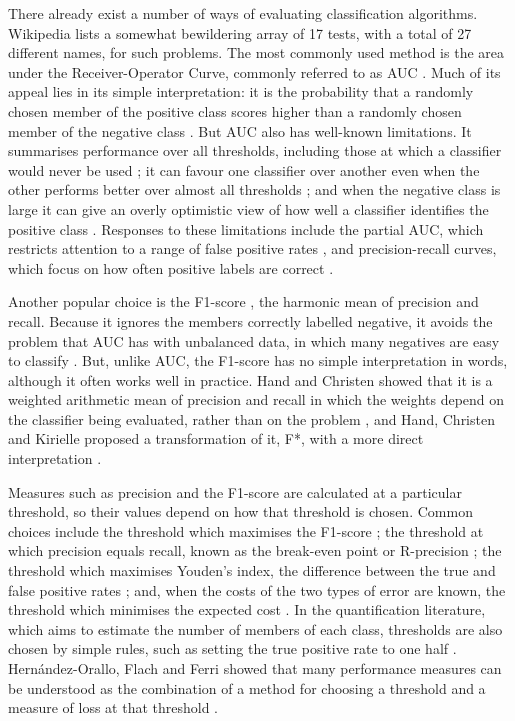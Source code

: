 \documentclass[preprint,12pt]{article}
\begin{document}
There already exist a number of ways of evaluating classification algorithms. Wikipedia lists a somewhat bewildering array of 17 tests, with a total of 27 different names, for such problems.  The most commonly used method is the area under the Receiver-Operator Curve, commonly referred to as AUC \cite{obuchowski2018receiver, vanderlooy2008critical, majnik2013roc}. Much of its appeal lies in its simple interpretation: it is the probability that a randomly chosen member of the positive class scores higher than a randomly chosen member of the negative class \cite{bamber1975area, hanley1982meaning}. But AUC also has well-known limitations. It summarises performance over all thresholds, including those at which a classifier would never be used \cite{lobo2008auc}; it can favour one classifier over another even when the other performs better over almost all thresholds \cite{hand2009measuring}; and when the negative class is large it can give an overly optimistic view of how well a classifier identifies the positive class \cite{davis2006relationship, saito2015precision}. Responses to these limitations include the partial AUC, which restricts attention to a range of false positive rates \cite{mcclish1989analyzing, dodd2003partial, carrington2020new}, and precision-recall curves, which focus on how often positive labels are correct \cite{davis2006relationship, saito2015precision, flach2015precision}.

Another popular choice is the F1-score \cite{sasaki2007truth}, the harmonic mean of precision and recall. Because it ignores the members correctly labelled negative, it avoids the problem that AUC has with unbalanced data, in which many negatives are easy to classify \cite{smlbook}. But, unlike AUC, the F1-score has no simple interpretation in words, although it often works well in practice. Hand and Christen showed that it is a weighted arithmetic mean of precision and recall in which the weights depend on the classifier being evaluated, rather than on the problem \cite{hand2018note}, and Hand, Christen and Kirielle proposed a transformation of it, F*, with a more direct interpretation \cite{hand2021f}.

Measures such as precision and the F1-score are calculated at a particular threshold, so their values depend on how that threshold is chosen. Common choices include the threshold which maximises the F1-score \cite{lipton2014optimal, koyejo2014consistent}; the threshold at which precision equals recall, known as the break-even point or R-precision \cite{manning2008introduction}; the threshold which maximises Youden's index, the difference between the true and false positive rates \cite{youden1950index}; and, when the costs of the two types of error are known, the threshold which minimises the expected cost \cite{elkan2001foundations}. In the quantification literature, which aims to estimate the number of members of each class, thresholds are also chosen by simple rules, such as setting the true positive rate to one half \cite{forman2008quantifying}. Hern\'andez-Orallo, Flach and Ferri showed that many performance measures can be understood as the combination of a method for choosing a threshold and a measure of loss at that threshold \cite{hernandez2012unified}. 
\end{document}
